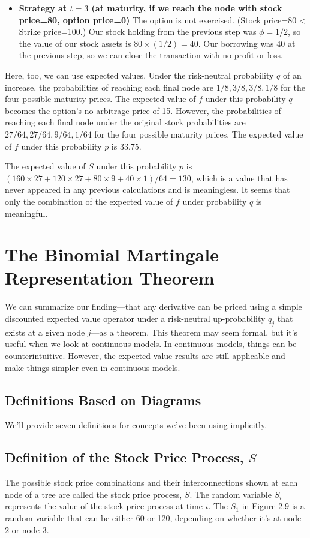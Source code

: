 \documentclass[uplatex,a4j,12pt,dvipdfmx]{jsarticle}
\begin{document}
\begin{itemize}
	\item \textbf{Strategy at $t=3$ (at maturity, if we reach the node with stock price=80, option price=0)}
	The option is not exercised. (Stock price=80 < Strike price=100.) Our stock holding from the previous step was $\phi=1/2$, so the value of our stock assets is $80 \times (1/2) = 40$. Our borrowing was 40 at the previous step, so we can close the transaction with no profit or loss.
\end{itemize}

Here, too, we can use expected values. Under the risk-neutral probability $q$ of an increase, the probabilities of reaching each final node are $1/8, 3/8, 3/8, 1/8$ for the four possible maturity prices. The expected value of $f$ under this probability $q$ becomes the option's no-arbitrage price of 15. However, the probabilities of reaching each final node under the original stock probabilities are $27/64, 27/64, 9/64, 1/64$ for the four possible maturity prices. The expected value of $f$ under this probability $p$ is 33.75.

The expected value of $S$ under this probability $p$ is $(160 \times 27+120 \times 27+80 \times 9+40 \times 1)/64=130$, which is a value that has never appeared in any previous calculations and is meaningless.
It seems that only the combination of the expected value of $f$ under probability $q$ is meaningful.


\section{The Binomial Martingale Representation Theorem}
We can summarize our finding—that any derivative can be priced using a simple discounted expected value operator under a risk-neutral up-probability $q_j$ that exists at a given node $j$—as a theorem. This theorem may seem formal, but it's useful when we look at continuous models. In continuous models, things can be counterintuitive. However, the expected value results are still applicable and make things simpler even in continuous models.

\subsection{Definitions Based on Diagrams}
We'll provide seven definitions for concepts we've been using implicitly.

\subsection{Definition of the Stock Price Process, $S$}
The possible stock price combinations and their interconnections shown at each node of a tree are called the stock price process, $S$. The random variable $S_i$ represents the value of the stock price process at time $i$. The $S_1$ in Figure 2.9 is a random variable that can be either 60 or 120, depending on whether it's at node 2 or node 3.
\end{document}
